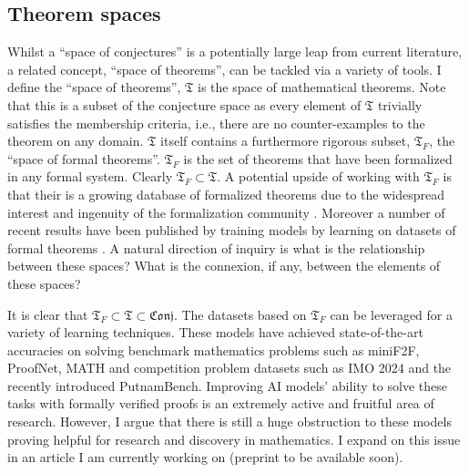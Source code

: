 \subsection{Theorem spaces}
Whilst a ``space of conjectures'' is a potentially large leap from current literature, a related concept, ``space of theorems'', can be tackled via a variety of tools.
I define the ``space of theorems'', $\mathfrak{T}$ is the space of mathematical theorems. Note that this is a subset of the conjecture space as every element of $\mathfrak{T}$ trivially satisfies the membership criteria, i.e.,
there are no counter-examples to the theorem on any domain.
$\mathfrak{T}$ itself contains a furthermore rigorous subset, $\mathfrak{T}_F$, the ``space of formal theorems''. $\mathfrak{T}_F$ is the set of theorems that have been formalized in any formal system. Clearly $\mathfrak{T}_F\subset\mathfrak{T}$. A potential upside of working with $\mathfrak{T}_F$ is that their is a growing database of formalized theorems due to the widespread interest and ingenuity of the formalization community \cite{formalization_examples}.
Moreover a number of recent results have been published by training models by learning on datasets of formal theorems \cite{Deepmind_stuff}. A natural direction of inquiry is what is the relationship between these spaces? What is the connexion, if any, between the elements of these spaces?
\\\par
It is clear that $\mathfrak{T}_F\subset\mathfrak{T}\subset\mathfrak{Conj}$. The datasets based on $\mathfrak{T}_F$ can be leveraged for a variety of learning techniques. These models have achieved state-of-the-art accuracies on solving benchmark mathematics problems such as miniF2F, ProofNet, MATH and competition problem datasets such as IMO 2024 and the recently introduced PutnamBench. Improving AI models' ability to solve these tasks with formally verified proofs
is an extremely active and fruitful area of research. However, I argue that there is still a huge obstruction to these models proving helpful for research and discovery in mathematics. I expand on this issue in an article I am currently working on (preprint to be available soon). 

